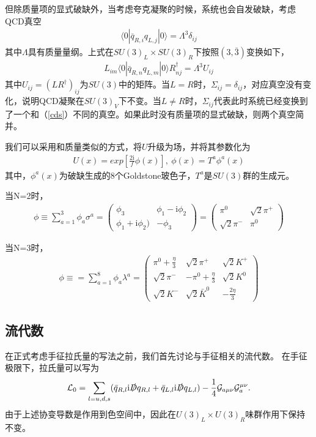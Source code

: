 \documentclass[aps,tightenlines,16pt]{ctexart}
\numberwithin{equation}{section}
\newcommand{\mL}{\mathcal{L}}
\begin{document}
但除质量项的显式破缺外，当考虑夸克凝聚的时候，系统也会自发破缺，考虑QCD真空
\begin{align}\label{cds}
   \langle 0 | \bar{q}_{R,i} q_{L,j}| 0 \rangle =\Lambda ^3 \delta_{ij}
\end{align}
其中$\Lambda$具有质量量纲\cite{kaplan2016lectures}。上式在$SU(3)_L \times SU(3)_R$下按照$(3,\bar{3})$变换如下，
\begin{align}
   L_{im}\langle 0 | \bar{q}_{R,n} q_{L,m}| 0 \rangle R^{\dagger}_{nj}=\Lambda ^3 U_{ij}
\end{align}
其中$U_{ij}=(LR^{\dagger})_{ij}$为$SU(3)$中的矩阵。当$L=R$时，$\Sigma_{ij}=\delta_{ij}$，对应真空没有变化，说明QCD凝聚在$SU(3)_V$下不变。当$L\neq R$时，$\Sigma_{ij}$代表此时系统已经变换到了一个和（\ref{cds}）不同的真空。如果此时没有质量项的显式破缺，则两个真空简并。

我们可以采用和质量类似的方式，将$U$升级为场，并将其参数化为
\begin{align}
   U(x)=exp[\frac{2\mbox{i} }{f} \phi(x)],\ \phi(x)=T^a \phi^a(x)
\end{align}
其中，$\phi^a(x)$为破缺生成的8个Goldstone玻色子，$T^a$是$SU(3)$群的生成元。

当N=2时，
\begin{align}
   \phi \equiv \sum_{a=1}^{3} \phi_a \sigma^a =
   \begin{pmatrix}
      \phi_3 & \phi_1 - \mbox{i} \phi_2 \\
      \phi_1 + \mbox{i} \phi_2) & -\phi_3
   \end{pmatrix}
   =\begin{pmatrix}
      \pi^0 & \sqrt{2}\pi^+ \\
      \sqrt{2}\pi^- & \pi^0
   \end{pmatrix}
\end{align}

当N=3时，
\begin{align}\label{n3phi}
   \phi \equiv =\sum_{a=1}^{8} \phi_a \lambda^a =
   \begin{pmatrix}
      \pi^0+\frac{\eta}{3} & \sqrt{2}\pi^+ & \sqrt{2}K^+ \\
      \sqrt{2}\pi^- & -\pi^0+\frac{\eta}{3} &\sqrt{2}K^0 \\
      \sqrt{2}K^- & \sqrt{2}\bar{K}^0 & -\frac{2\eta}{3}
   \end{pmatrix}
\end{align}

\subsection{流代数}
   在正式考虑手征拉氏量的写法之前，我们首先讨论与手征相关的流代数。
在手征极限下，拉氏量可以写为
\begin{align}\label{L_QCD}
   \mL_{0} = \sum_{l=u,d,s} (\bar{q}_{R,l} \mbox{i}\slashed{D} q_{R,l} + \bar{q}_{L,l} \mbox{i}\slashed{D} q_{L,l}) -\frac{1}{4}\mathcal{G}_{a\mu\nu}\mathcal{G}_a^{\mu\nu}.
\end{align}
由于上述协变导数是作用到色空间中，因此在$U(3)_L \times U(3)_R$味群作用下保持不变。
\end{document}
